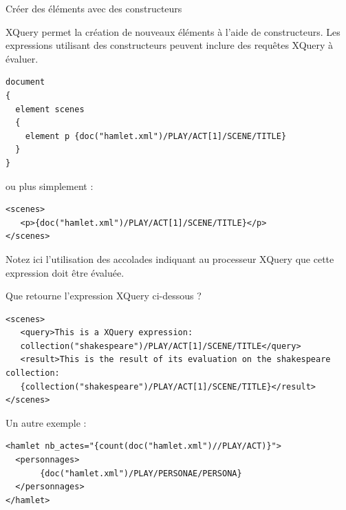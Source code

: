 \begin{frame}{Créer des éléments avec des constructeurs}

XQuery permet la création de nouveaux éléments à l'aide de constructeurs. Les expressions utilisant des constructeurs peuvent inclure des requêtes XQuery à évaluer.

\bigskip

\begin{lstlisting}[basicstyle=\footnotesize]
document
{
  element scenes
  {
    element p {doc("hamlet.xml")/PLAY/ACT[1]/SCENE/TITLE}
  }
}
\end{lstlisting}

ou plus simplement :

\begin{lstlisting}
<scenes>
   <p>{doc("hamlet.xml")/PLAY/ACT[1]/SCENE/TITLE}</p>
</scenes>
\end{lstlisting}

Notez ici l'utilisation des accolades indiquant au processeur XQuery que cette expression doit être évaluée.

\framebreak

\begin{exoblock}
Que retourne l'expression XQuery ci-dessous ?
\end{exoblock}

\begin{lstlisting}
<scenes>
   <query>This is a XQuery expression:
   collection("shakespeare")/PLAY/ACT[1]/SCENE/TITLE</query>
   <result>This is the result of its evaluation on the shakespeare collection:
   {collection("shakespeare")/PLAY/ACT[1]/SCENE/TITLE}</result>
</scenes>
\end{lstlisting}


\framebreak

Un autre exemple : 

\begin{lstlisting}
<hamlet nb_actes="{count(doc("hamlet.xml")//PLAY/ACT)}">
  <personnages>
       {doc("hamlet.xml")/PLAY/PERSONAE/PERSONA}
  </personnages>
</hamlet>
\end{lstlisting}

\framebreak


\end{frame}
